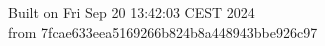 {\noindent Built on Fri Sep 20 13:42:03 CEST 2024} \\ 
 {\noindent from 7fcae633eea5169266b824b8a448943bbe926c97}
